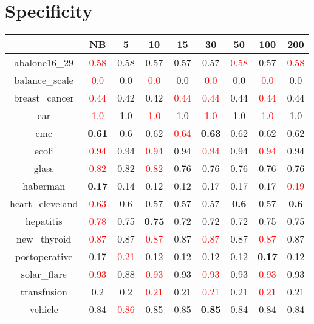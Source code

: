 \documentclass{article}%
\begin{document}
\section*{Specificity}%
\begin{tabular}{c|cccccccc}%
\hline%
&NB&5&10&15&30&50&100&200\\%
\hline%
abalone16\_29&\textcolor{red}{ 
0.58
}&0.58&0.57&0.57&0.57&\textcolor{red}{ 
0.58
}&0.57&\textcolor{red}{ 
0.58
}\\%
\hline%
balance\_scale&\textcolor{red}{ 
0.0
}&0.0&\textcolor{red}{ 
0.0
}&0.0&\textcolor{red}{ 
0.0
}&0.0&\textcolor{red}{ 
0.0
}&0.0\\%
\hline%
breast\_cancer&\textcolor{red}{ 
0.44
}&0.42&0.42&\textcolor{red}{ 
0.44
}&\textcolor{red}{ 
0.44
}&0.44&\textcolor{red}{ 
0.44
}&0.44\\%
\hline%
car&\textcolor{red}{ 
1.0
}&1.0&\textcolor{red}{ 
1.0
}&1.0&\textcolor{red}{ 
1.0
}&1.0&\textcolor{red}{ 
1.0
}&1.0\\%
\hline%
cmc&\textbf{0.61}&0.6&0.62&\textcolor{red}{ 
0.64
}&\textbf{0.63}&0.62&0.62&0.62\\%
\hline%
ecoli&\textcolor{red}{ 
0.94
}&0.94&\textcolor{red}{ 
0.94
}&0.94&\textcolor{red}{ 
0.94
}&0.94&\textcolor{red}{ 
0.94
}&0.94\\%
\hline%
glass&\textcolor{red}{ 
0.82
}&0.82&\textcolor{red}{ 
0.82
}&0.76&0.76&0.76&0.76&0.76\\%
\hline%
haberman&\textbf{0.17}&0.14&0.12&0.12&0.17&0.17&0.17&\textcolor{red}{ 
0.19
}\\%
\hline%
heart\_cleveland&\textcolor{red}{ 
0.63
}&0.6&0.57&0.57&0.57&\textbf{0.6}&0.57&\textbf{0.6}\\%
\hline%
hepatitis&\textcolor{red}{ 
0.78
}&0.75&\textbf{0.75}&0.72&0.72&0.72&0.75&0.75\\%
\hline%
new\_thyroid&\textcolor{red}{ 
0.87
}&0.87&\textcolor{red}{ 
0.87
}&0.87&\textcolor{red}{ 
0.87
}&0.87&\textcolor{red}{ 
0.87
}&0.87\\%
\hline%
postoperative&0.17&\textcolor{red}{ 
0.21
}&0.12&0.12&0.12&0.12&\textbf{0.17}&0.12\\%
\hline%
solar\_flare&\textcolor{red}{ 
0.93
}&0.88&\textcolor{red}{ 
0.93
}&0.93&\textcolor{red}{ 
0.93
}&0.93&\textcolor{red}{ 
0.93
}&0.93\\%
\hline%
transfusion&0.2&0.2&\textcolor{red}{ 
0.21
}&0.21&\textcolor{red}{ 
0.21
}&0.21&\textcolor{red}{ 
0.21
}&0.21\\%
\hline%
vehicle&0.84&\textcolor{red}{ 
0.86
}&0.85&0.85&\textbf{0.85}&0.84&0.84&0.84\\%

\end{tabular}
\end{document}
